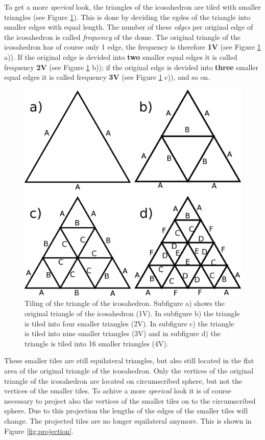 \documentclass[a4paper,12pt]{article}
\begin{document}
To get a more \emph{sperical} look, the triangles of the icosahedron are tiled with smaller triangles (see Figure \ref{fig:tiling}). This is done by deviding the egdes of the triangle into smaller edges with equal length. The number of these \emph{edges} per original edge of the icosahedron is called \emph{frequency} of the dome. The original triangle of the icosahedron has of course only 1 edge, the frequency is therefore \textbf{1V} (see Figure \ref{fig:tiling} a)). If the original edge is devided into \textbf{two} smaller equal edges it is called frequency \textbf{2V} (see Figure \ref{fig:tiling} b)); if the original edge is devided into \textbf{three} smaller equal edges it is called frequency \textbf{3V} (see Figure \ref{fig:tiling} c)), and so on.

\begin{figure}
	\centering
	\includegraphics[width=0.7\linewidth]{../images/triangle_tiling.eps}
	\caption{Tiling of the triangle of the icosahedron. Subfigure a) shows the original triangle of the icosahedron (1V). In subfigure b) the triangle is tiled into four smaller triangles (2V). In subfigure c) the triangle is tiled into nine smaller triangles (3V) and in subfigure d) the triangle is tiled into 16 smaller triangles (4V).}
	\label{fig:tiling}
\end{figure}

These smaller tiles are still equilateral triangles, but also still located in the flat area of the original triangle of the icosahedron. Only the vertices of the original triangle of the icosahedron are located on circumscribed sphere, but not the vertices of the smaller tiles. To achive a more \emph{sperical} look it is of course necessary to project also the vertices of the smaller tiles on to the circumscribed sphere. Due to this projection the lengths of the edges of the smaller tiles will change. The projected tiles are no longer equilateral anymore. This is shown in Figure \ref{fig:projection}. 
\end{document}
